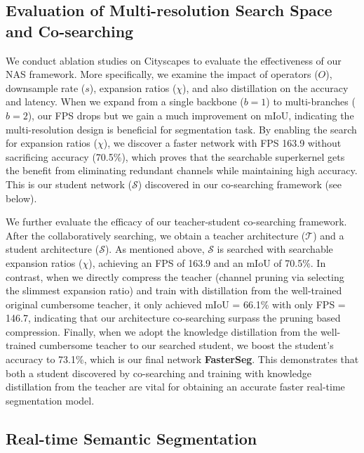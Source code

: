 \documentclass{article} \usepackage{iclr2020_conference,times}
\begin{document}
\subsection{Evaluation of Multi-resolution Search Space and Co-searching}\vspace{-0.5em}
We conduct ablation studies on Cityscapes to evaluate the effectiveness of our NAS framework. More specifically, we examine the impact of operators ($O$), downsample rate ($s$), expansion ratios ($\chi$), and also distillation on the accuracy and latency. When we expand from a single backbone ($b=1$) to multi-branches ($b=2$), our FPS drops but we gain a much improvement on mIoU, indicating the multi-resolution design is beneficial for segmentation task. By enabling the search for expansion ratios ($\chi$), we discover a faster network with FPS 163.9 without sacrificing accuracy (70.5\%), which proves that the searchable superkernel gets the benefit from eliminating redundant channels while maintaining high accuracy. This is our student network ($\mathcal{S}$) discovered in our co-searching framework (see below).

We further evaluate the efficacy of our teacher-student co-searching framework.
After the collaboratively searching, we obtain a teacher architecture ($\mathcal{T}$) and a student architecture ($\mathcal{S}$). As mentioned above, $\mathcal{S}$ is searched with searchable expansion ratios ($\chi$), achieving an FPS of 163.9 and an mIoU of 70.5\%. In contrast, when we directly compress the teacher (channel pruning via selecting the slimmest expansion ratio) and train with distillation from the well-trained original cumbersome teacher, it only achieved mIoU = 66.1\% with only FPS = 146.7, indicating that our architecture co-searching surpass the pruning based compression. Finally, when we adopt the knowledge distillation from the well-trained cumbersome teacher to our searched student, we boost the student's accuracy to 73.1\%, which is our final network \textbf{FasterSeg}. This demonstrates that both a student discovered by co-searching and training with knowledge distillation from the teacher are vital for obtaining an accurate faster real-time segmentation model.\vspace{-0.5em}







\subsection{Real-time Semantic Segmentation}\vspace{-0.5em}
\end{document}
